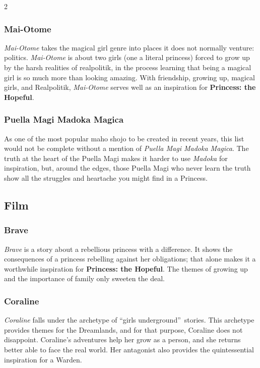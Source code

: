 \begin{multicols}{2}
\subsubsection*{Mai-Otome}

\textit{Mai-Otome} takes the magical girl genre into places it does not normally venture: politics. \textit{Mai-Otome} is about two girls (one a literal princess) forced to grow up by the harsh realities of realpolitik, in the process learning that being a magical girl is so much more than looking amazing. With friendship, growing up, magical girls, and Realpolitik, \textit{Mai-Otome} serves well as an inspiration for \textbf{Princess: the Hopeful}. 

\subsubsection*{Puella Magi Madoka Magica}

As one of the most popular maho shojo to be created in recent years, this list would not be complete without a mention of \textit{Puella Magi Madoka Magica}. The truth at the heart of the Puella Magi makes it harder to use \textit{Madoka} for inspiration, but, around the edges, those Puella Magi who never learn the truth show all the struggles and heartache you might find in a Princess. 

\subsection*{Film}

\subsubsection*{Brave} 

\textit{Brave} is a story about a rebellious princess with a difference. It shows the consequences of a princess rebelling against her obligations; that alone makes 
it a worthwhile inspiration for \textbf{Princess: the Hopeful}. The themes of growing up and the importance of family only sweeten the deal. 

\subsubsection*{Coraline}

\textit{Coraline} falls under the archetype of \textquotedblleft girls underground\textquotedblright\, stories. This archetype provides themes for the Dreamlands, and for that purpose, Coraline does not disappoint. Coraline's adventures help her grow as a person, and she returns better able to face the real world. Her antagonist also provides the quintessential inspiration for a Warden. 


\end{multicols}
